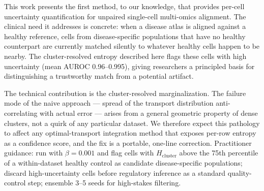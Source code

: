 \documentclass[pmlr]{jmlr}
\newcommand{\Hcluster}{H_{\text{cluster}}}
\begin{document}
This work presents the first method, to our knowledge, that provides per-cell uncertainty quantification for unpaired single-cell multi-omics alignment. The clinical need it addresses is concrete: when a disease atlas is aligned against a healthy reference, cells from disease-specific populations that have no healthy counterpart are currently matched silently to whatever healthy cells happen to be nearby. The cluster-resolved entropy described here flags these cells with high uncertainty (mean AUROC 0.96--0.995), giving researchers a principled basis for distinguishing a trustworthy match from a potential artifact.

The technical contribution is the cluster-resolved marginalization. The failure mode of the naive approach --- spread of the transport distribution anti-correlating with actual error --- arises from a general geometric property of dense clusters, not a quirk of any particular dataset. We therefore expect this pathology to affect any optimal-transport integration method that exposes per-row entropy as a confidence score, and the fix is a portable, one-line correction. Practitioner guidance: run with $\beta = 0.001$ and flag cells with $\Hcluster$ above the 75th percentile of a within-dataset healthy control as candidate disease-specific populations; discard high-uncertainty cells before regulatory inference as a standard quality-control step; ensemble 3--5 seeds for high-stakes filtering.
\end{document}
